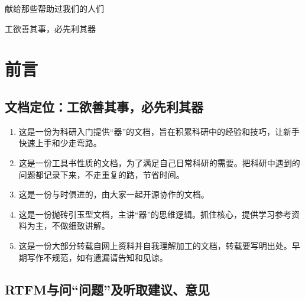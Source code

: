 \documentclass[cn,11pt,chinese,twoside]{elegantbook}
\begin{document}
\maketitle
\frontmatter


\newpage
\thispagestyle{empty}
\noindent\begin{center}
{\fontsize{20pt}{0}\kaishu 献给那些帮助过我们的人们}
\end{center} 

\newpage
\thispagestyle{empty}
\noindent\begin{center}
{\fontsize{20pt}{0}\kaishu 工欲善其事，必先利其器} %
\end{center} 


\tableofcontents
\label{content}
\mainmatter


\chapter*{前言}
\section*{文档定位：工欲善其事，必先利其器}
\begin{enumerate}
\item 这是一份为科研入门提供“器”的文档，旨在积累科研中的经验和技巧，让新手快速上手和少走弯路。
\item 这是一份工具书性质的文档，为了满足自己日常科研的需要。把科研中遇到的问题都记录下来，不走重复的路，节省时间。
\item 这是一份与时俱进的，由大家一起开源协作的文档。
\item 这是一份抛砖引玉型文档，主讲“器”的思维逻辑。抓住核心，提供学习参考资料为主，不做细致讲解。
\item 这是一份大部分转载自网上资料并自我理解加工的文档，转载要写明出处。早期写作不规范，如有遗漏请告知和见谅。
\end{enumerate}


\section*{RTFM与问“问题”及听取建议、意见}
\end{document}
